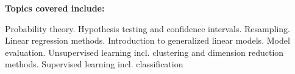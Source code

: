 \documentclass[12pt]{article}\usepackage[]{graphicx}\usepackage[]{color}
\begin{document}
\vspace{0.5cm}
\Large
\textbf{Topics covered include:} 

Probability theory. Hypothesis testing and confidence intervals. Resampling. Linear regression methods. Introduction to generalized linear models. Model evaluation. Unsupervised learning incl. clustering and dimension reduction methods. Supervised learning incl. classification

\large
\vspace{0.2cm}
\end{document}
